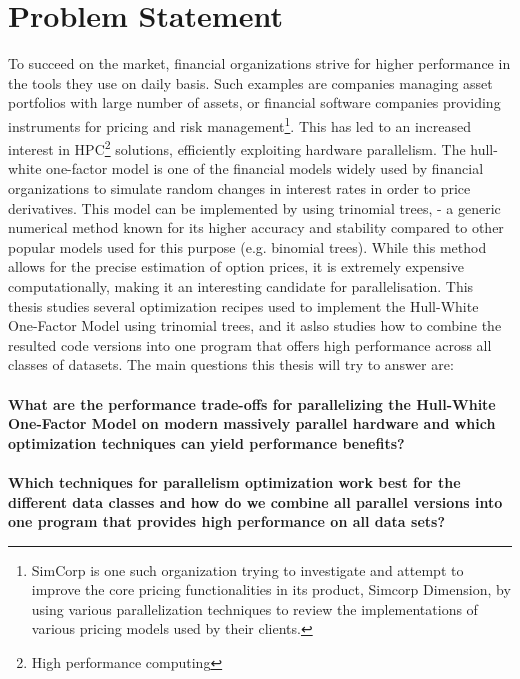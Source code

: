
\section{Problem Statement}
\label{section:problemstatement}
To succeed on the market, financial organizations strive for higher performance in the tools they use on daily basis. Such examples are companies managing asset portfolios with large number of assets, or financial software companies providing instruments for pricing and risk management\footnote{SimCorp is one such organization trying to investigate and attempt to improve the core pricing functionalities in its product, Simcorp Dimension, by using various parallelization techniques to review the implementations of various pricing models used by their clients.}. This has led to an increased interest in HPC\footnote{High performance computing} solutions, efficiently exploiting hardware parallelism. The hull-white one-factor model is one of the financial models widely used by financial organizations to simulate random changes in interest rates in order to price derivatives. This model can be implemented by using trinomial trees\cite[pg. 444]{ofod}, \cite{uhwirt} - a generic numerical method known for its higher accuracy and stability compared to other popular models used for this purpose (e.g. binomial trees). While this method allows for the precise estimation of option prices, it is extremely expensive computationally, making it an interesting candidate for parallelisation. This thesis studies several optimization recipes used to implement the Hull-White One-Factor Model using trinomial trees, and it aslso studies how to combine the resulted code versions into one program that offers high performance across all classes of datasets. The main questions this thesis will try to answer are:\\\\
\textbf{What are the performance trade-offs for parallelizing the Hull-White One-Factor Model on modern massively parallel hardware and which optimization techniques can yield performance benefits?}\\\\
\textbf{Which techniques for parallelism optimization work best for the different data classes and how do we combine all parallel versions into one program that provides high performance on all data sets?}


